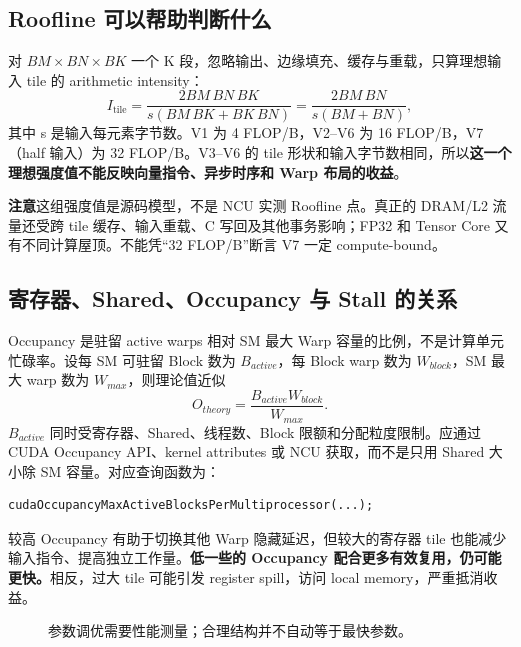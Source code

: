 \documentclass[UTF8,11pt,a4paper,fontset=fandol]{ctexart}
\newcommand{\caution}[1]{\par\noindent\colorbox{PaleOrange}{\parbox{\dimexpr\linewidth-2\fboxsep\relax}{\textbf{注意}\quad #1}}\par}
\newcommand{\pagebreakhere}{\clearpage}
\begin{document}
\subsection{Roofline 可以帮助判断什么}
对 $BM\times BN\times BK$ 一个 K 段，忽略输出、边缘填充、缓存与重载，只算理想输入 tile 的 arithmetic intensity：
\[
I_{\mathrm{tile}}=\frac{2BM\,BN\,BK}{s(BM\,BK+BK\,BN)}
=\frac{2BM\,BN}{s(BM+BN)},
\]
其中 s 是输入每元素字节数。V1 为 4 FLOP/B，V2--V6 为 16 FLOP/B，V7（half 输入）为 32 FLOP/B。V3--V6 的 tile 形状和输入字节数相同，所以\textbf{这一个理想强度值不能反映向量指令、异步时序和 Warp 布局的收益}。

\caution{这组强度值是源码模型，不是 NCU 实测 Roofline 点。真正的 DRAM/L2 流量还受跨 tile 缓存、输入重载、C 写回及其他事务影响；FP32 和 Tensor Core 又有不同计算屋顶。不能凭“32 FLOP/B”断言 V7 一定 compute-bound。}
\pagebreakhere

\subsection{寄存器、Shared、Occupancy 与 Stall 的关系}
Occupancy 是驻留 active warps 相对 SM 最大 Warp 容量的比例，不是计算单元忙碌率。设每 SM 可驻留 Block 数为 $B_{active}$，每 Block warp 数为 $W_{block}$，SM 最大 warp 数为 $W_{max}$，则理论值近似
\[
O_{theory}=\frac{B_{active}W_{block}}{W_{max}}.
\]
$B_{active}$ 同时受寄存器、Shared、线程数、Block 限额和分配粒度限制。应通过 CUDA Occupancy API、kernel attributes 或 NCU 获取，而不是只用 Shared 大小除 SM 容量。对应查询函数为：
\begin{lstlisting}[numbers=none]
cudaOccupancyMaxActiveBlocksPerMultiprocessor(...);
\end{lstlisting}

较高 Occupancy 有助于切换其他 Warp 隐藏延迟，但较大的寄存器 tile 也能减少输入指令、提高独立工作量。\textbf{低一些的 Occupancy 配合更多有效复用，仍可能更快。}相反，过大 tile 可能引发 register spill，访问 local memory，严重抵消收益。

\begin{figure}[H]\centering
{}
\caption{参数调优需要性能测量；合理结构并不自动等于最快参数。}
\end{figure}
\end{document}
